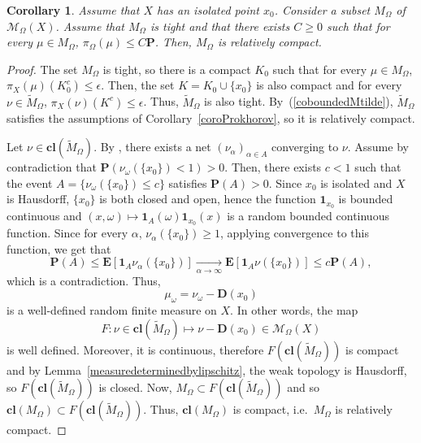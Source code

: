 \documentclass{amsart}
\newtheorem{cor}[thm]{Corollary}
\theoremstyle{definition}
\theoremstyle{remark}
\begin{document}
\begin{cor}\label{coroProkhorovisolated}
Assume that $X$ has an isolated point $x_0$.
Consider a subset $M_\Omega$ of $\mathcal{M}_\Omega(X)$.
Assume that $M_\Omega$ is tight and that there exists $C\geq 0$ such that for every $\mu\in M_\Omega$,
$\pi_\Omega(\mu)\leq C \mathbf P$.
Then, $M_\Omega$ is relatively compact.
\end{cor}

\begin{proof}
The set $M_\Omega$ is tight, so there is a compact $K_0$ such that for every $\mu\in M_\Omega$,
$\pi_X(\mu)(K_0^c)\leq \epsilon$.
Then, the set $K=K_0\cup \{x_0\}$ is also compact and for every $\nu\in \widetilde{M}_\Omega$,
$\pi_X(\nu)(K^c)\leq \epsilon$.
Thus, $\widetilde{M}_\Omega$ is also tight.
By~(\ref{coboundedMtilde}), $\widetilde{M}_\Omega$ satisfies the assumptions of Corollary~\ref{coroProkhorov},
so it is relatively compact.

Let $\nu\in \mathbf{cl}(\widetilde{M}_\Omega)$.
By \cite[Theorem~2.14]{AliprantisBorder}, there exists a net $(\nu_\alpha)_{\alpha\in A}$ converging to $\nu$.
Assume by contradiction that $\mathbf P(\nu_\omega(\{x_0\})<1)>0$.
Then, there exists $c<1$ such that
the event $A=\{\nu_\omega(\{x_0\})\leq c\}$ satisfies $\mathbf P(A)>0$.
Since $x_0$ is isolated and $X$ is Hausdorff, $\{x_0\}$ is both closed and open, hence the function $\mathbf 1_{x_0}$ is bounded continuous
and $(x,\omega)\mapsto \mathbf{1}_A(\omega)\mathbf{1}_{x_0}(x)$ is a random bounded continuous function.
Since for every $\alpha$, $\nu_\alpha(\{x_0\})\geq 1$, applying convergence to this function, we get that
$$\mathbf P(A)\leq \mathbf E[\mathbf 1_A\nu_\alpha(\{x_0\})]\underset{\alpha\to \infty}{\longrightarrow}\mathbf E[\mathbf 1_A\nu(\{x_0\})]\leq c\mathbf P(A),$$
which is a contradiction.
Thus,
$$\mu_\omega=\nu_\omega-\mathbf D(x_0)$$
is a well-defined random finite measure on $X$.
In other words, the map
$$F:\nu\in \mathbf{cl}(\widetilde{M}_\Omega)\mapsto \nu-\mathbf{D}(x_0)\in \mathcal{M}_\Omega(X)$$
is well defined.
Moreover, it is continuous, therefore $F(\mathbf{cl}(\widetilde{M}_\Omega))$ is compact and by Lemma~\ref{measuredeterminedbylipschitz}, the weak topology is Hausdorff, so $F(\mathbf{cl}(\widetilde{M}_\Omega))$ is closed.
Now, $M_\Omega\subset F(\mathbf{cl}(\widetilde{M}_\Omega))$ and so  $\mathbf{cl}(M_\Omega)\subset F(\mathbf{cl}(\widetilde{M}_\Omega))$.
Thus, $\mathbf{cl}(M_\Omega)$ is compact, i.e.\ $M_\Omega$ is relatively compact.
\end{proof}






\end{document}
